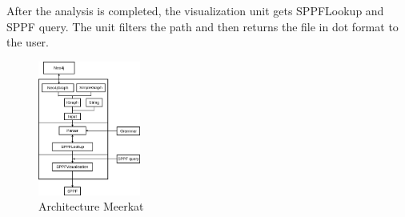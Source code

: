 After the analysis is completed, the visualization unit gets SPPFLookup and SPPF query. The unit filters the path and then returns the file in dot format to the user.
\begin{figure}
\caption{Architecture Meerkat}
\label{fig:architecture}
\includegraphics[width=0.3\textwidth]{architecture.jpg}
\end{figure} 




